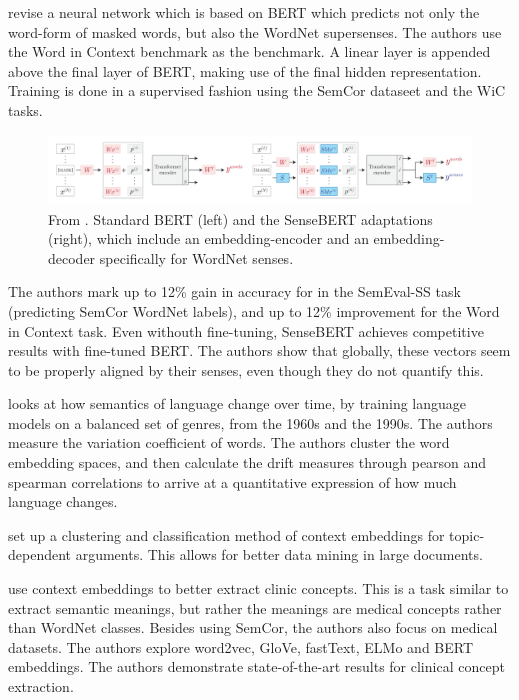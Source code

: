 \documentclass[a4paper,12pt,twoside,openright]{report}
\begin{document}
\cite{levine19} revise a neural network which is based on BERT which predicts not only the word-form of masked words, but also the WordNet supersenses.
The authors use the Word in Context benchmark as the benchmark.
A linear layer is appended above the final layer of BERT, making use of the final hidden representation.
Training is done in a supervised fashion using the SemCor dataseet and the WiC tasks.

\begin{figure}[H]
	\center
  \includegraphics[width=\linewidth]{./assets/relatedwork/sensebert.png}
  \caption{From \cite{levine19}. Standard BERT (left) and the SenseBERT adaptations (right), which include an embedding-encoder and an embedding-decoder specifically for WordNet senses.}
  \label{fig:embeddings_by_language}
\end{figure}

The authors mark up to 12\% gain in accuracy for in the SemEval-SS task (predicting SemCor WordNet labels), and up to 12\% improvement for the Word in Context task.
Even withouth fine-tuning, SenseBERT achieves competitive results with fine-tuned BERT.
The authors show that globally, these vectors seem to be properly aligned by their senses, even though they do not quantify this.


\cite{martinc20} looks at how semantics of language change over time, by training language models on a balanced set of genres, from the 1960s and the 1990s.
The authors measure the variation coefficient of words.
The authors cluster the word embedding spaces, and then calculate the drift measures through pearson and spearman correlations to arrive at a quantitative expression of how much language changes.

\cite{reimers19} set up a clustering and classification method of context embeddings for topic-dependent arguments.
This allows for better data mining in large documents.

\cite{si19} use context embeddings to better extract clinic concepts. 
This is a task similar to extract semantic meanings, but rather the meanings are medical concepts rather than WordNet classes.
Besides using SemCor, the authors also focus on medical datasets.
The authors explore word2vec, GloVe, fastText, ELMo and BERT embeddings.
The authors demonstrate state-of-the-art results for clinical concept extraction.
\end{document}
